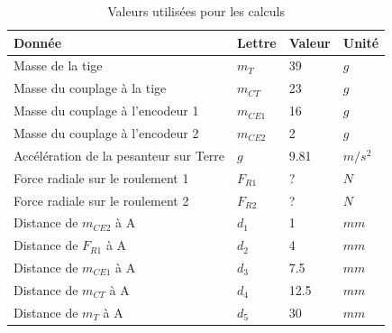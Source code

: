 \begin{table}[H]
  \centering
  \caption{Valeurs utilisées pour les calculs}
  \label{tab:ValCalcRoul}
  \begin{tabular}{|l|l|l|l|}
    \hline
    \textbf{Donnée}                        & \textbf{Lettre} & \textbf{Valeur} & \textbf{Unité} \\ \hline
    Masse de la tige                       & $m_T$           & 39              & $g$            \\ \hline
    Masse du couplage à la tige            & $m_{CT}$        & 23              & $g$            \\ \hline
    Masse du couplage à l'encodeur 1       & $m_{CE1}$       & 16              & $g$            \\ \hline
    Masse du couplage à l'encodeur 2       & $m_{CE2}$       & 2               & $g$            \\ \hline
    Accélération de la pesanteur sur Terre & $g$             & 9.81            & $m/s^2$        \\ \hline
    Force radiale sur le roulement 1       & $F_{R1}$        & ?               & $N$            \\ \hline
    Force radiale sur le roulement 2       & $F_{R2}$        & ?               & $N$            \\ \hline
    Distance de $m_{CE2}$ à A              & $d_1$           & 1               & $mm$           \\ \hline
    Distance de $F_{R1}$ à A               & $d_2$           & 4               & $mm$           \\ \hline
    Distance de $m_{CE1}$ à A              & $d_3$           & 7.5             & $mm$           \\ \hline
    Distance de $m_{CT}$ à A               & $d_4$           & 12.5            & $mm$           \\ \hline
    Distance de $m_{T}$ à A                & $d_5$           & 30              & $mm$           \\ \hline
  \end{tabular}%
\end{table}

